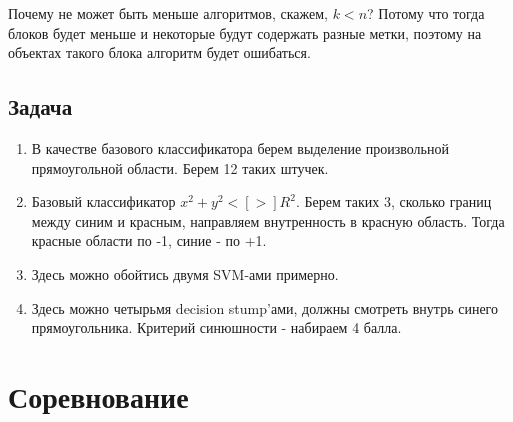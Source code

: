 \documentclass[12pt]{article}
\begin{document}
Почему не может быть меньше алгоритмов, скажем, $k < n$? Потому что тогда блоков будет меньше и некоторые будут содержать разные метки, поэтому на объектах такого блока алгоритм будет ошибаться.

\subsection{Задача}
\begin{enumerate}[label=\alph*]
	\item В качестве базового классификатора берем выделение произвольной прямоугольной области. Берем 12 таких штучек.
	\item Базовый классификатор $x^2 + y^2 <[>] R^2$. Берем таких 3, сколько границ между синим и красным, направляем внутренность
	в красную область. Тогда красные области по -1, синие - по +1.
	\item Здесь можно обойтись двумя SVM-ами примерно.
	\item Здесь можно четырьмя decision stump'ами, должны смотреть внутрь синего прямоугольника. Критерий синюшности - набираем 4 балла.
\end{enumerate}

\section{Соревнование}
\end{document}

